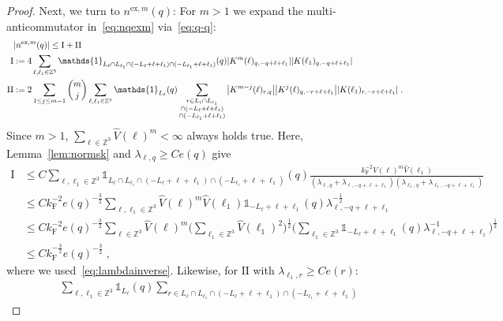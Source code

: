 \documentclass[12pt,a4paper]{article}
\numberwithin{equation}{section}
\newcommand{\1}{\mathbb{I}}
\newcommand{\ex}{\mathrm{ex}}
\newcommand{\F}{\mathrm{F}}
\newcommand{\I}{\mathrm{I}}
\newcommand{\II}{\mathrm{II}}
\newcommand{\Zstar}{\mathbb{Z}^3} %
\newcommand{\Z}{\mathbb{Z}}
\newcommand{\half}{\frac{1}{2}}
\theoremstyle{plain}
\theoremstyle{definition}
\theoremstyle{remark}
\theoremstyle{plain}
\theoremstyle{definition}
\theoremstyle{remark}
\begin{document}
\begin{proof}
Next, we turn to $ n^{\ex,m}(q) $: For $ m > 1 $ we expand the multi-anticommutator in~\eqref{eq:nqexm} via~\eqref{eq:q-q}:
\begin{equation}
\begin{aligned}
	&|n^{\ex,m}(q)|
	\leq \I + \II \\
	\I
	&:= 4 \sum_{\ell,\ell_1 \in \Zstar}
		\mathds{1}_{L_\ell \cap L_{\ell_1} \cap (-L_\ell + \ell + \ell_1) \cap (-L_{\ell_1} + \ell + \ell_1)}(q)
		\abs{K^m(\ell)_{q,-q+\ell+\ell_1}}
		\abs{K(\ell_1)_{q,-q+\ell+\ell_1}} \\
	\II
	&:= 2 \sum_{1 \le j \le m-1} {{m}\choose j} \sum_{\ell,\ell_1 \in \Zstar}
		\mathds{1}_{L_\ell}(q)
		\sum_{\substack{r\in L_{\ell} \cap L_{\ell_1}\\ \cap (-L_{\ell}+\ell+\ell_1) \\ \cap (-L_{\ell_1}+\ell+\ell_1 )}}
		\abs{K^{m-j}(\ell)_{r,q}}
		\abs{K^j(\ell)_{q,-r+\ell+\ell_1}}
		\abs{K(\ell_1)_{r,-r+\ell+\ell_1}} \;.
\end{aligned}
\end{equation}
Since $ m > 1 $, $ \sum_{\ell \in \Zstar} \hat{V}(\ell)^m < \infty $ always holds true. Here, Lemma~\ref{lem:normsk} and $  \lambda_{\ell,q} \geq C e(q) $ give
\begin{align}
	\I
	&\leq C \sum_{\ell,\ell_1 \in \Zstar}
		\mathds{1}_{L_\ell \cap L_{\ell_1} \cap (-L_\ell + \ell + \ell_1) \cap (-L_{\ell_1} + \ell + \ell_1)}(q)
		\frac{k_{\F}^{-2} \hat{V}(\ell)^m \hat{V}(\ell_1)}{(\lambda_{\ell,q} + \lambda_{\ell,-q+\ell+\ell_1}) (\lambda_{\ell_1,q} + \lambda_{\ell_1,-q+\ell+\ell_1})} \nonumber\\
	&\leq C k_{\F}^{-2} e(q)^{-\frac 32} \sum_{\ell,\ell_1 \in \Zstar} \hat{V}(\ell)^m \hat{V}(\ell_1)
		\mathds{1}_{-L_\ell + \ell + \ell_1}(q)
		\lambda_{\ell,-q+\ell+\ell_1}^{-\frac 12} \nonumber\\ 
	&\leq C k_{\F}^{-2} e(q)^{-\frac 32} \sum_{\ell \in \Zstar} \hat{V}(\ell)^m
		\Bigg( \sum_{\ell_1 \in \Zstar} \hat{V}(\ell_1)^2 \Bigg)^{\half}
		\Bigg( \sum_{\ell_1 \in \Z^3} \mathds{1}_{-L_\ell + \ell + \ell_1}(q)
		\lambda_{\ell,-q+\ell+\ell_1}^{-1} \Bigg)^{\half} \nonumber\\
	&\leq C k_{\F}^{-\frac 32} e(q)^{-\frac 32} \;,
\end{align}
where we used~\eqref{eq:lambdainverse}. Likewise, for $ \II $ with $ \lambda_{\ell_1,r} \ge C e(r) $:
\begin{align}
	&\sum_{\ell,\ell_1 \in \Zstar}
		\mathds{1}_{L_\ell}(q)
		\sum_{r\in L_{\ell} \cap L_{\ell_1} \cap (-L_{\ell}+\ell+\ell_1) \cap (-L_{\ell_1}+\ell+\ell_1 )}

\end{align}
\end{proof}
\end{document}
